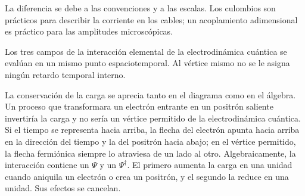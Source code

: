 \begin{classroomqa}
\end{classroomqa}

La diferencia se debe a las convenciones y a las escalas. Los culombios son prácticos para describir la corriente en los cables; un acoplamiento adimensional es práctico para las amplitudes microscópicas.

Los tres campos de la interacción elemental de la electrodinámica cuántica se evalúan en un mismo punto espaciotemporal. Al vértice mismo no se le asigna ningún retardo temporal interno.

\begin{classroomqa}
\end{classroomqa}

\begin{classroomqa}
\end{classroomqa}

La conservación de la carga se aprecia tanto en el diagrama como en el álgebra. Un proceso que transformara un electrón entrante en un positrón saliente invertiría la carga y no sería un vértice permitido de la electrodinámica cuántica. Si el tiempo se representa hacia arriba, la flecha del electrón apunta hacia arriba en la dirección del tiempo y la del positrón hacia abajo; en el vértice permitido, la flecha fermiónica siempre lo atraviesa de un lado al otro. Algebraicamente, la interacción contiene un \(\Psi\) y un \(\Psi^\dagger\). El primero aumenta la carga en una unidad cuando aniquila un electrón o crea un positrón, y el segundo la reduce en una unidad. Sus efectos se cancelan.

